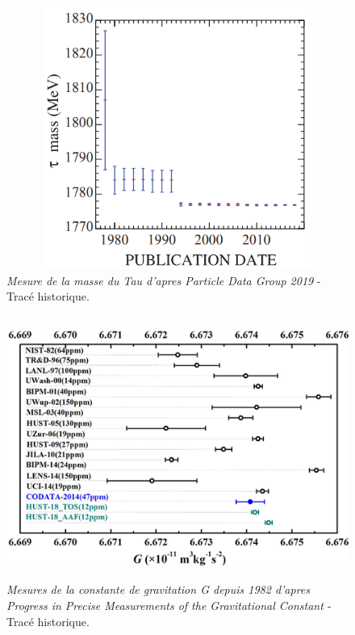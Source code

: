\documentclass[a4paper,12pt]{article}
\begin{document}
\begin{appendix}
\begin{figure}
\centering
\includegraphics[width=13.5cm,height=8.6cm]{./figures/tau-mass-pdg.png}
\caption [Mesures de la masse du Tau depuis 1978]{\textit{Mesure de la masse du Tau d'apres Particle Data Group 2019} - Tracé historique.} 
\label{fig:7:figure7}
\end{figure}

\begin{figure}
\centering
\includegraphics[width=14.5cm,height=8.6cm]{./figures/ProgressinPreciseMeasurementsoftheGravitationalConstant.png}
\caption[Mesures de la constante de gravitation G depuis 1982]{\textit{Mesures de la constante de gravitation G depuis 1982 d'apres Progress in Precise Measurements of the Gravitational Constant \cite{Wu}} - Tracé historique.} 
\label{fig:8:figure8}
\end{figure}


\end{appendix}
\end{document}

